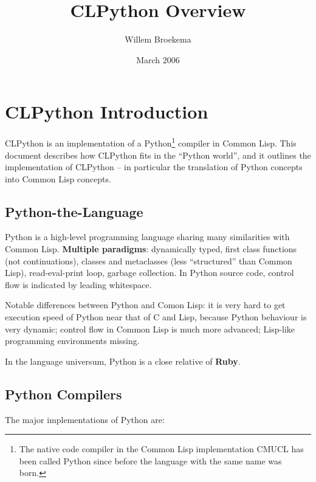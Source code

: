 \documentclass{article}
\begin{document}
\title{CLPython Overview}
\author{Willem Broekema}
\date{March 2006}
\maketitle

\tableofcontents{}

\section{CLPython Introduction}
CLPython is an implementation of a Python\footnote{The native code
compiler in the Common Lisp implementation CMUCL has been called
Python since before the language with the same name was born.}
compiler in Common Lisp. This document describes how CLPython fits in
the ``Python world'', and it outlines the implementation of CLPython
-- in particular the translation of Python concepts into Common Lisp
concepts.

\subsection{Python-the-Language}
Python is a high-level programming language sharing many similarities
with Common Lisp. {\bf Multiple paradigms}: dynamically typed, first
class functions (not continuations), classes and metaclasses (less
``structured'' than Common Lisp), read-eval-print loop, garbage
collection. In Python source code, control flow is indicated by
leading whitespace.

Notable differences between Python and Comon Lisp: it is very hard to
get execution speed of Python near that of C and Lisp, because Python
behaviour is very dynamic; control flow in Common Lisp is much more
advanced; Lisp-like programming environments missing.

In the language universum, Python is a close relative of {\bf Ruby}.

\subsection{Python Compilers}
The major implementations of Python are:
\end{document}
